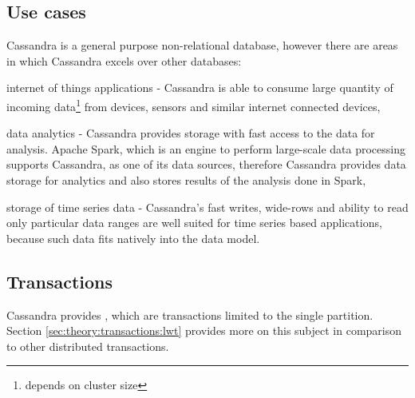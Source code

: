 \subsection{Use cases}
Cassandra is a general purpose non-relational database, however there are areas in which Cassandra excels over other databases:
\begin{enumerate*}
\item internet of things applications - Cassandra is able to consume large quantity of incoming data\footnote{depends on cluster size} from devices, sensors and similar internet connected devices,
\item data analytics - Cassandra provides storage with fast access to the data for analysis. Apache Spark, which is an engine to perform large-scale data processing \cite{ApacheSpark} supports Cassandra, as one of its data sources, therefore Cassandra provides data storage for analytics and also stores results of the analysis done in Spark,
\item storage of time series data - Cassandra's fast writes, wide-rows and ability to read only particular data ranges are well suited for time series based applications, because such data fits natively into the data model.
\end{enumerate*} 

\subsection{Transactions}
Cassandra provides \lwt, which are transactions limited to the single partition.
Section \ref{sec:theory:transactions:lwt} provides more on this subject in comparison to other distributed transactions. 

